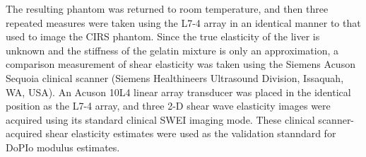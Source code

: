 The resulting phantom was returned to room temperature, and then three repeated measures were taken using the L7-4 array in an identical manner to that used to image the CIRS phantom. Since the true elasticity of the liver is unknown and the stiffness of the gelatin mixture is only an approximation, a comparison measurement of shear elasticity was taken using the Siemens Acuson Sequoia clinical scanner (Siemens Healthineers Ultrasound Division, Issaquah, WA, USA). An Acuson 10L4 linear array transducer was placed in the identical position as the L7-4 array, and three 2-D shear wave elasticity images were acquired using its standard clinical SWEI imaging mode. These clinical scanner-acquired shear elasticity estimates were used as the validation stanndard for DoPIo modulus estimates.
